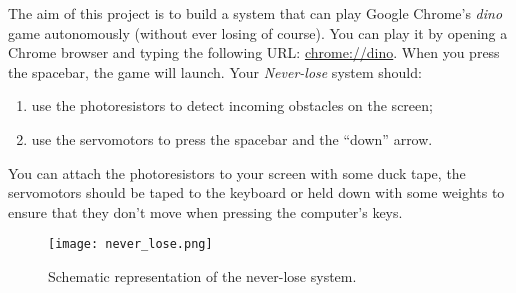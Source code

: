 The aim of this project is to build a system that can play Google Chrome's \textit{dino} game autonomously (without ever losing of course). You can play it by opening a Chrome browser and typing the following URL: \url{chrome://dino}. When you press the spacebar, the game will launch. Your \textit{Never-lose} system should: 
\begin{enumerate}
	\item use the photoresistors to detect incoming obstacles on the screen; 
	\item use the servomotors to press the spacebar and the ``down'' arrow. 
\end{enumerate}
You can attach the photoresistors to your screen with some duck tape, the servomotors should be taped to the keyboard or held down with some weights to ensure that they don't move when pressing the computer's keys. 

\begin{figure}[h]
	\centering
	\texttt{[image: never\_lose.png]}
	\caption{Schematic representation of the never-lose system. }
	\label{fig:never_lose}
\end{figure}


